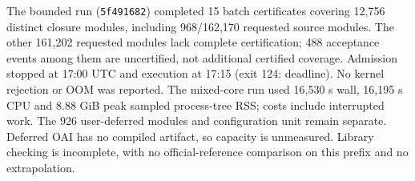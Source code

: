 The bounded run (\texttt{5f491682}) completed 15 batch certificates covering
12,756 distinct closure modules, including 968/162,170 requested source modules.
The other 161,202 requested modules lack complete certification; 488 acceptance
events among them are uncertified, not additional certified coverage.
Admission stopped at 17:00 UTC and execution at 17:15 (exit 124: deadline).
No kernel rejection or OOM was reported. The mixed-core run used 16,530 s wall,
16,195 s CPU and 8.88 GiB peak sampled process-tree RSS; costs include
interrupted work. The 926 user-deferred modules and configuration unit remain
separate. Deferred OAI has no compiled artifact, so capacity is unmeasured.
Library checking is incomplete, with no official-reference comparison on
this prefix and no extrapolation.
